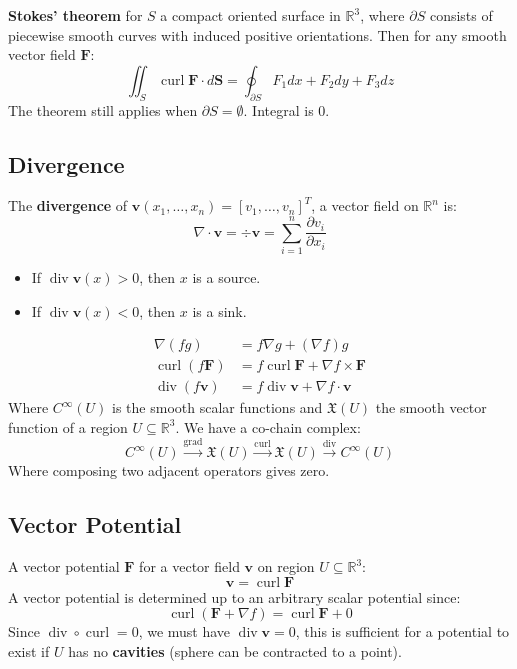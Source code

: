 \documentclass[a4paper]{article}
\newcommand{\RR}{\mathbb{R}}
\def\pp#1#2{\frac{\partial #1}{\partial #2}}
\def\grad{\operatorname{grad}}
\def\divergence{\operatorname{div}}
\def\curl{\operatorname{curl}}
\begin{document}
\begin{multicols}{2}
	\textbf{Stokes' theorem} for $S$ a compact oriented surface in $\RR^3$, where $\partial S$ consists of piecewise smooth curves with induced positive orientations. Then for any smooth vector field $\mathbf{F}$:
	\[
		\iint_S \curl \mathbf{F}\cdot d\mathbf{S}=\oint_{\partial S}F_1dx+F_2dy+F_3dz
	\]
	The theorem still applies when $\partial S=\emptyset$. Integral is $0$.

	\subsection*{Divergence}
	The \textbf{divergence} of $\mathbf{v}(x_1,\dots,x_n)=[v_1,\dots,v_n]^T$, a vector field on $\RR^n$ is:
	$$\nabla\cdot \mathbf{v} =\div\mathbf{v}=\sum_{i=1}^n\pp{v_i}{x_i}$$
	\begin{itemize}
		\item If $\divergence \mathbf{v}(x)>0$, then $x$ is a source.
		\item If $\divergence \mathbf{v}(x)<0$, then $x$ is a sink.
	\end{itemize}

	\begin{align*}
		\nabla(fg)               & = f\nabla g + (\nabla f)g                          \\
		\curl(f\mathbf{F})       & = f\curl\mathbf{F}+\nabla f \times \mathbf{F}      \\
		\divergence(f\mathbf{v}) & =f\divergence\mathbf{v} + \nabla f\cdot \mathbf{v}
	\end{align*}
	Where $C^\infty(U)$ is the smooth scalar functions and $\mathfrak{X}(U)$ the smooth vector function of a region $U\subseteq \RR^3$. We have a co-chain complex:
	\[
		C^\infty(U)
		\xrightarrow{\grad}\mathfrak{X}(U)
		\xrightarrow{\curl}\mathfrak{X}(U)
		\xrightarrow{\divergence}C^\infty(U)
	\]
	Where composing two adjacent operators gives zero.

	\subsection*{Vector Potential}
	A vector potential $\mathbf{F}$ for a vector field $\mathbf{v}$ on region $U\subseteq\RR^3$:
	$$\mathbf{v}=\curl\mathbf{F}$$
	A vector potential is determined up to an arbitrary scalar potential since:
	$$\curl(\mathbf{F}+\nabla f)=\curl\mathbf{F} +0$$
	Since $\divergence\circ\curl=0$, we must have $\divergence\mathbf{v}=0$, this is sufficient for a potential to exist if $U$ has no \textbf{cavities} (sphere can be contracted to a point).


\end{multicols}
\end{document}
